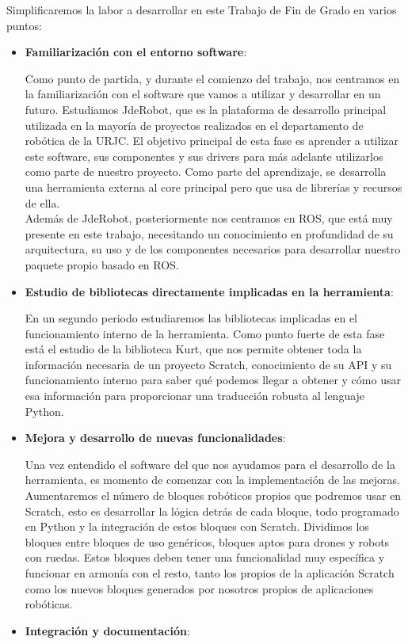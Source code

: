 Simplificaremos la labor a desarrollar en este Trabajo de Fin de Grado en varios puntos:
\begin{itemize}
\item \textbf{Familiarización con el entorno software}: 

Como punto de partida, y durante el comienzo del trabajo, nos centramos en la familiarización con el software que vamos a utilizar y desarrollar en un futuro. Estudiamos JdeRobot, que es la plataforma de desarrollo principal utilizada en la mayoría de proyectos realizados en el departamento de robótica de la URJC. El objetivo principal de esta fase es aprender a utilizar este software, sus componentes y sus drivers para más adelante utilizarlos como parte de nuestro proyecto. Como parte del aprendizaje, se desarrolla una herramienta externa al core principal pero que usa de librerías y recursos de ella.\\

Además de JdeRobot, posteriormente nos centramos en ROS, que está muy presente en este trabajo, necesitando un conocimiento en profundidad de su arquitectura, su uso y de los componentes necesarios para desarrollar nuestro paquete propio basado en ROS.
\item \textbf{Estudio de bibliotecas directamente implicadas en la herramienta}: 

En un segundo periodo estudiaremos las bibliotecas implicadas en el funcionamiento interno de la herramienta. Como punto fuerte de esta fase está el estudio de la biblioteca Kurt, que nos permite obtener toda la información necesaria de un proyecto Scratch, conocimiento de su API y su funcionamiento interno para saber qué podemos llegar a obtener y cómo usar esa información para proporcionar una traducción robusta al lenguaje Python.
\item \textbf{Mejora y desarrollo de nuevas funcionalidades}: 

Una vez entendido el software del que nos ayudamos para el desarrollo de la herramienta, es momento de comenzar con la implementación de las mejoras. Aumentaremos el número de bloques robóticos propios que podremos usar en Scratch, esto es desarrollar la lógica detrás de cada bloque, todo programado en Python y la integración de estos bloques con Scratch. Dividimos los bloques entre bloques de uso genéricos, bloques aptos para drones y robots con ruedas. Estos bloques deben tener una funcionalidad muy específica y funcionar en armonía con el resto, tanto los propios de la aplicación Scratch como los nuevos bloques generados por nosotros propios de aplicaciones robóticas.
\item \textbf{Integración y documentación}: 


\end{itemize}
